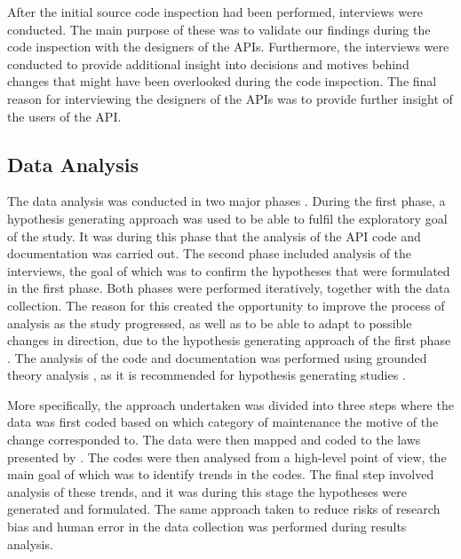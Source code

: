\documentclass[conference]{IEEEtran}
\begin{document}
After the initial source code inspection had been performed, interviews were conducted. The main purpose of these was to validate our findings during the code inspection with the designers of the APIs. Furthermore, the interviews were conducted to provide additional insight into decisions and motives behind changes that might have been overlooked during the code inspection. The final reason for interviewing the designers of the APIs was to provide further insight of the users of the API. 



\subsection{Data Analysis} \label{data_analysis}
The data analysis was conducted in two major phases \cite{andersson2007spiral}. During the first phase, a hypothesis generating approach \cite{seaman1999qualitative} was used to be able to fulfil the exploratory goal of the study. It was during this phase that the analysis of the API code and documentation was carried out. The second phase included analysis of the interviews, the goal of which was to confirm the hypotheses \cite{seaman1999qualitative} that were formulated in the first phase. Both phases were performed iteratively, together with the data collection. The reason for this created the opportunity to improve the process of analysis as the study progressed, as well as to be able to adapt to possible changes in direction, due to the hypothesis generating approach of the first phase \cite{andersson2007spiral}. The analysis of the code and documentation was performed using grounded theory analysis \cite{seaman1999qualitative}, as it is recommended for hypothesis generating studies \cite{runeson2009guidelines} \cite{seaman1999qualitative}.

More specifically, the approach undertaken was divided into three steps where the data was first coded based on which category of maintenance \cite{chapin2001types} the motive of the change corresponded to. The data were then mapped and coded to the laws presented by \cite{lehman1980programs}. The codes were then analysed from a high-level point of view, the main goal of which was to identify trends in the codes. The final step involved analysis of these trends, and it was during this stage the hypotheses were generated and formulated. The same approach taken to reduce risks of research bias and human error in the data collection was performed during results analysis. 
\end{document}
